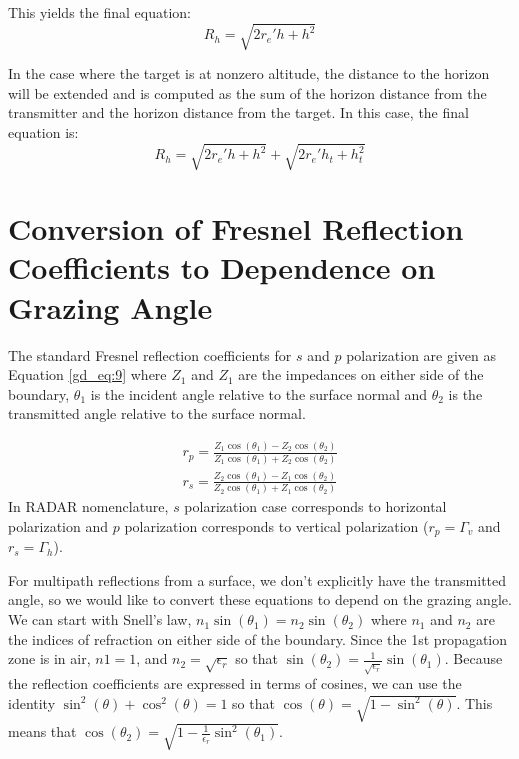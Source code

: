 \noindent This yields the final equation:
\begin{equation}
\label{gd_eq:8}
\boxed{R_h = \sqrt{2r_e'h + h^2}}
\end{equation}
\renewcommand{\baselinestretch}{2} \small\normalsize

In the case where the target is at nonzero altitude, the distance to the horizon will be extended and is computed as the sum of the horizon distance from the transmitter and the horizon distance from the target. In this case, the final equation is:
\begin{equation}
\label{gd_eq:8}
\boxed{R_h = \sqrt{2r_e'h + h^2} + \sqrt{2r_e'h_t + h_t^2}}
\end{equation}
\renewcommand{\baselinestretch}{2} \small\normalsize

\section{Conversion of Fresnel Reflection Coefficients to Dependence on Grazing Angle}
The standard Fresnel reflection coefficients for $s$ and $p$ polarization are given as Equation \ref{gd_eq:9} \cite{zangwill_modern_em} where $Z_1$ and $Z_1$ are the impedances on either side of the boundary, $\theta_1$ is the incident angle relative to the surface normal and $\theta_2$ is the transmitted angle relative to the surface normal.

\begin{equation}
\begin{gathered}
\label{gd_eq:9}
r_p = \frac{Z_1\cos(\theta_1) - Z_2\cos(\theta_2)}{Z_1\cos(\theta_1) + Z_2\cos(\theta_2)} \\
r_s = \frac{Z_2\cos(\theta_1) - Z_1\cos(\theta_2)}{Z_2\cos(\theta_1) + Z_1\cos(\theta_2)}
\end{gathered}
\end{equation}
\renewcommand{\baselinestretch}{2} \small\normalsize
In RADAR nomenclature, $s$ polarization case corresponds to horizontal polarization and $p$ polarization corresponds to vertical polarization ($r_p = \Gamma_v$ and $r_s = \Gamma_h$).

For multipath reflections from a surface, we don't explicitly have the transmitted angle, so we would like to convert these equations to depend on the grazing angle. We can start with Snell's law, $n_1\sin(\theta_1) = n_2\sin(\theta_2)$ where $n_1$ and $n_2$ are the indices of refraction on either side of the boundary. Since the 1st propagation zone is in air, $n1 = 1$, and $n_2 = \sqrt{\epsilon_r}$ so that $\sin(\theta_2) = \frac{1}{\sqrt{\epsilon_r}}\sin(\theta_1)$. Because the reflection coefficients are expressed in terms of cosines, we can use the identity $\sin^2(\theta) + \cos^2(\theta) = 1$ so that $\cos(\theta) = \sqrt{1 - \sin^2(\theta)}$. This means that $\cos(\theta_2) = \sqrt{1 - \frac{1}{\epsilon_r}\sin^2(\theta_1)}$.

